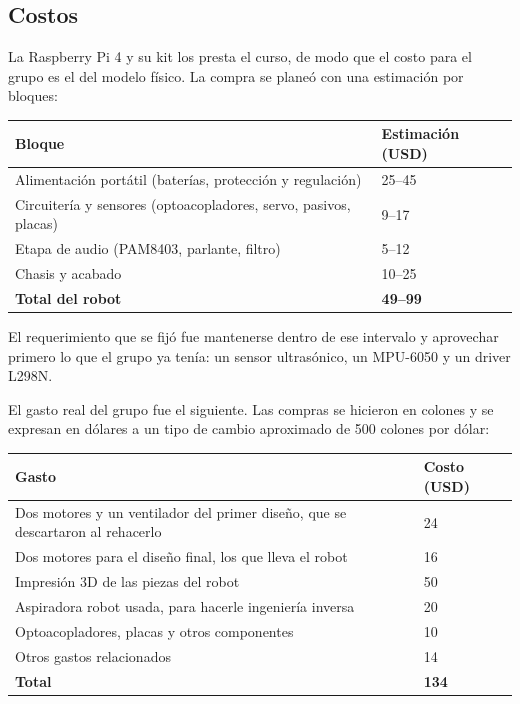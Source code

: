 \documentclass[11pt,a4paper]{article}
\begin{document}
\subsection{Costos}

La Raspberry Pi 4 y su kit los presta el curso, de modo que el costo para el
grupo es el del modelo físico. La compra se planeó con una estimación por
bloques:

\begin{center}
\begin{tabular}{L{6.6cm}C{3.2cm}}
\toprule
\textbf{Bloque} & \textbf{Estimación (USD)} \\
\midrule
Alimentación portátil (baterías, protección y regulación) & 25--45 \\
Circuitería y sensores (optoacopladores, servo, pasivos, placas) & 9--17 \\
Etapa de audio (PAM8403, parlante, filtro) & 5--12 \\
Chasis y acabado & 10--25 \\
\midrule
\textbf{Total del robot} & \textbf{49--99} \\
\bottomrule
\end{tabular}
\end{center}

El requerimiento que se fijó fue mantenerse dentro de ese intervalo y
aprovechar primero lo que el grupo ya tenía: un sensor ultrasónico, un
MPU-6050 y un driver L298N.

El gasto real del grupo fue el siguiente. Las compras se hicieron en
colones y se expresan en dólares a un tipo de cambio aproximado de 500
colones por dólar:

\begin{center}
\begin{tabular}{L{9.4cm}C{3.2cm}}
\toprule
\textbf{Gasto} & \textbf{Costo (USD)} \\
\midrule
Dos motores y un ventilador del primer diseño, que se descartaron al
rehacerlo & 24 \\
Dos motores para el diseño final, los que lleva el robot & 16 \\
Impresión 3D de las piezas del robot & 50 \\
Aspiradora robot usada, para hacerle ingeniería inversa & 20 \\
Optoacopladores, placas y otros componentes & 10 \\
Otros gastos relacionados & 14 \\
\midrule
\textbf{Total} & \textbf{134} \\
\bottomrule
\end{tabular}
\end{center}
\end{document}

